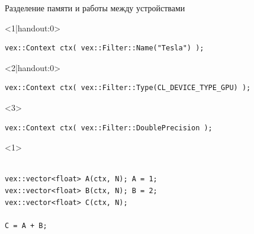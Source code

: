 \documentclass[@BEAMER_OPTIONS@]{beamer}
\begin{document}
\begin{frame}[fragile]{Разделение памяти и работы между устройствами}
    \begin{exampleblock}{}
        \begin{onlyenv}<1|handout:0>
        \begin{lstlisting}[escapechar=!]
vex::Context ctx( vex::Filter::Name("Tesla") );
        \end{lstlisting}
        \end{onlyenv}
        \begin{onlyenv}<2|handout:0>
        \begin{lstlisting}[escapechar=!]
vex::Context ctx( vex::Filter::Type(CL_DEVICE_TYPE_GPU) );
        \end{lstlisting}
        \end{onlyenv}
        \begin{onlyenv}<3>
        \begin{lstlisting}[escapechar=!]
vex::Context ctx( vex::Filter::DoublePrecision );
        \end{lstlisting}
        \end{onlyenv}
        \begin{uncoverenv}<1>
        \begin{lstlisting}[firstnumber=last]

vex::vector<float> A(ctx, N); A = 1;
vex::vector<float> B(ctx, N); B = 2;
vex::vector<float> C(ctx, N);

C = A + B;
        \end{lstlisting}
        \end{uncoverenv}
    \end{exampleblock}
    \begin{figure}
\end{figure}
\end{frame}
\end{document}
